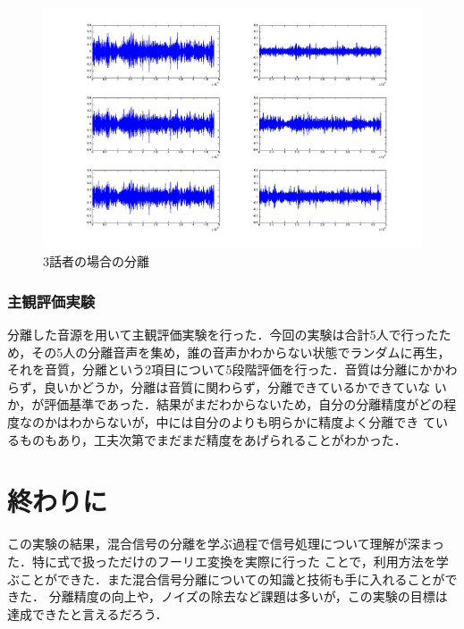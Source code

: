 \documentclass[a4j]{jarticle}
\begin{document}
\newpage
\begin{figure}[htb]
 \begin{center}
  \includegraphics[width=13cm, clip, bb=0 0 1381 881]{pic/bunri3.jpg}
  \caption{3話者の場合の分離}
  \label{bunri3}
 \end{center}
\end{figure}
\subsubsection{主観評価実験}
分離した音源を用いて主観評価実験を行った．今回の実験は合計5人で行ったため，その5人の分離音声を集め，誰の音声かわからない状態でランダムに再生，
それを音質，分離という2項目について5段階評価を行った．音質は分離にかかわらず，良いかどうか，分離は音質に関わらず，分離できているかできていな
いか，が評価基準であった．結果がまだわからないため，自分の分離精度がどの程度なのかはわからないが，中には自分のよりも明らかに精度よく分離でき
ているものもあり，工夫次第でまだまだ精度をあげられることがわかった．

\section{終わりに}
この実験の結果，混合信号の分離を学ぶ過程で信号処理について理解が深まった．特に式で扱っただけのフーリエ変換を実際に行った
ことで，利用方法を学ぶことができた．また混合信号分離についての知識と技術も手に入れることができた．
分離精度の向上や，ノイズの除去など課題は多いが，この実験の目標は達成できたと言えるだろう．
\end{document}
